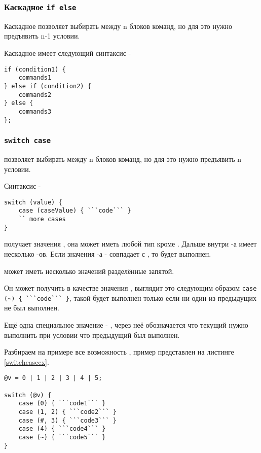\subsubsection{Каскадное \lstinline|if else|}

Каскадное  позволяет выбирать между n блоков команд, но для это нужно предъявить n-1 условии.

Каскадное  имеет следующий синтаксис -
\begin{lstlisting}[numbers=none]
if (condition1) {
	commands1
} else if (condition2) {
	commands2
} else {
	commands3
};
\end{lstlisting}

\subsubsection{\lstinline|switch case|}

 позволяет выбирать между n блоков команд, но для это нужно предъявить n условии.

Синтаксис -
\begin{lstlisting}[numbers=none]
switch (value) {
	case (caseValue) { ```code``` }
	`` more cases
}
\end{lstlisting}

 получает значения , она может иметь любой тип кроме \bool. Дальше внутри -а имеет несколько -ов. Если значения -а -  совпадает с , то  будет выполнен.

 может иметь несколько значений разделённые запятой.

Он может получить в качестве значения \void, выглядит это следующим образом \lstinline|case (~) { ```code``` }|, такой  будет выполнен только если ни один из предыдущих не был выполнен.

Ещё одна специальное значение - \code{#}, через неё обозначается что текущий  нужно выполнить при условии что предыдущий был выполнен.

Разбираем на примере все возможность , пример представлен на листинге \ref{switchcaseex}.

\begin{lstlisting}[caption=Использование switch case, label=switchcaseex]
@v = 0 | 1 | 2 | 3 | 4 | 5;

switch (@v) {
	case (0) { ```code1``` }
	case (1, 2) { ```code2``` }
	case (#, 3) { ```code3``` }
	case (4) { ```code4``` }
	case (~) { ```code5``` }
}
\end{lstlisting}

